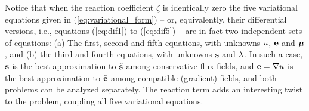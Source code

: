 \begin{remark}
	Notice that when the reaction coefficient $\zeta$ is identically zero the five variational equations given in (\ref{eq:variational_form}) -- or, equivalently, their differential versions, i.e., equations (\ref{eq:dif1}) to (\ref{eq:dif5}) -- are in fact two independent sets of equations: (a) The first, second and fifth equations, with unknowns $u$, $\mathbf{e}$ and $\boldsymbol{\mu}$, and (b) the third and fourth equations, with unknowns $\mathbf{s}$ and $\lambda$. In such a case, $\mathbf{s}$ is the best approximation to $\mathbf{\tilde{s}}$ among conservative flux fields, and $\mathbf{e}=\nabla u$ is the best approximation to $\mathbf{\tilde{e}}$ among compatible (gradient) fields, and both problems can be analyzed separately. The reaction term adds an interesting twist to the problem, coupling all five variational equations.	
\end{remark}

